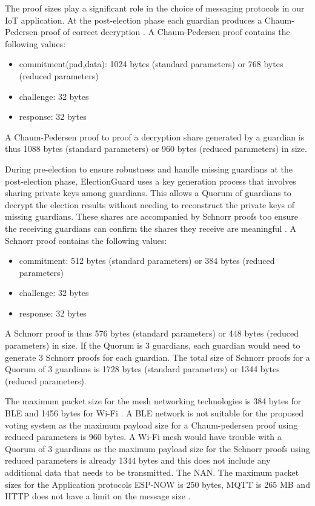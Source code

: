 The proof sizes play a significant role in the choice of messaging protocols in our IoT application.
At the post-election phase each guardian produces a Chaum-Pedersen proof of correct decryption \cite[15]{eg-paper}.
A Chaum-Pedersen proof contains the following values:
\begin{itemize}
    \item commitment(pad,data): 1024 bytes (standard parameters) or 768 bytes (reduced parameters)
    \item challenge: 32 bytes
    \item response: 32 bytes
\end{itemize}
A Chaum-Pedersen proof to proof a decryption share generated by a guardian is thus 1088 bytes (standard parameters) or 960 bytes (reduced parameters) in size.

During pre-election to ensure robustness and handle missing guardians at the post-election phase, ElectionGuard uses a key generation process that involves sharing private keys among guardians. This allows a Quorum of guardians to decrypt the election results without needing to reconstruct the private keys of missing guardians. These shares are accompanied by Schnorr proofs too ensure the receiving guardians can confirm the shares they receive are meaningful \cite[9]{eg-spec}. 
A Schnorr proof contains the following values:
\begin{itemize}
    \item commitment: 512 bytes (standard parameters) or 384 bytes (reduced parameters)
    \item challenge: 32 bytes
    \item response: 32 bytes
\end{itemize}
A Schnorr proof is thus 576 bytes (standard parameters) or 448 bytes (reduced parameters) in size. If the Quorum is 3 guardians, each guardian would need to generate 3 Schnorr proofs for each guardian. The total size of Schnorr proofs for a Quorum of 3 guardians is 1728 bytes (standard parameters) or 1344 bytes (reduced parameters).


The maximum packet size for the mesh networking technologies is 384 bytes for \ac{BLE} and 1456 bytes for Wi-Fi \cite[35,54]{esp-faq}. A \ac{BLE} network is not suitable for the proposed voting system as the maximum payload size for a Chaum-pedersen proof using reduced parameters is 960 bytes. A Wi-Fi mesh would have trouble with a Quorum of 3 guardians as the maximum payload size for the Schnorr proofs using reduced parameters is already 1344 bytes and this does not include any additional data that needs to be transmitted. The \ac{NAN}. The maximum packet sizes for the Application protocols ESP-NOW is 250 bytes, MQTT is 265 MB and HTTP does not have a limit on the message size \cite[47]{esp-faq} \cite[16]{protocols}.

